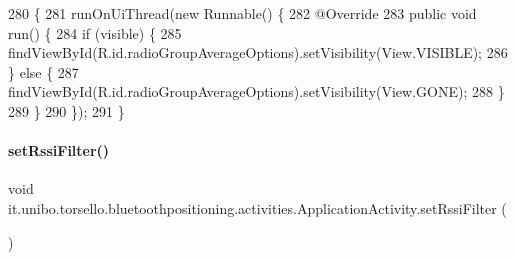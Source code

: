 \begin{DoxyCode}
280                                                              \{
281         runOnUiThread(\textcolor{keyword}{new} Runnable() \{
282             @Override
283             \textcolor{keyword}{public} \textcolor{keywordtype}{void} run() \{
284                 \textcolor{keywordflow}{if} (visible) \{
285                     findViewById(R.id.radioGroupAverageOptions).setVisibility(View.VISIBLE);
286                 \} \textcolor{keywordflow}{else} \{
287                     findViewById(R.id.radioGroupAverageOptions).setVisibility(View.GONE);
288                 \}
289             \}
290         \});
291     \}
\end{DoxyCode}
\hypertarget{classit_1_1unibo_1_1torsello_1_1bluetoothpositioning_1_1activities_1_1ApplicationActivity_a8b2514096adfe574c15cc5317a45cd58_a8b2514096adfe574c15cc5317a45cd58}{}\label{classit_1_1unibo_1_1torsello_1_1bluetoothpositioning_1_1activities_1_1ApplicationActivity_a8b2514096adfe574c15cc5317a45cd58_a8b2514096adfe574c15cc5317a45cd58} 
\paragraph{\texorpdfstring{set\+Rssi\+Filter()}{setRssiFilter()}}
{\footnotesize\ttfamily void it.\+unibo.\+torsello.\+bluetoothpositioning.\+activities.\+Application\+Activity.\+set\+Rssi\+Filter (\begin{DoxyParamCaption}{ }\end{DoxyParamCaption})\hspace{0.3cm}{\ttfamily [private]}}


